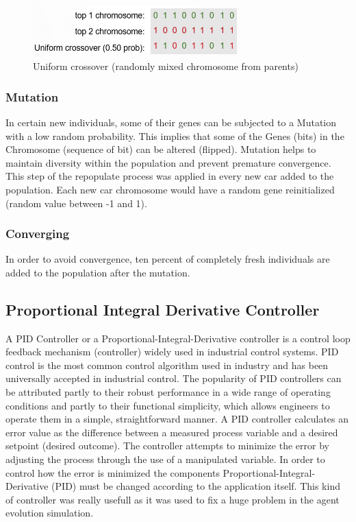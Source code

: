 \documentclass[conference]{IEEEtran}
\begin{document}
\begin{figure}[t]
    \centerline{\includegraphics[width=80mm,scale=4]{assets/uniform_crossover.png}}
    \caption{Uniform crossover (randomly mixed chromosome from parents)}
    \label{fig:crossover}
\end{figure}

\subsubsection{Mutation}
In certain new individuals, some of their genes can be subjected to a Mutation with a low random probability.
This implies that some of the Genes (bits) in the Chromosome (sequence of bit) can be altered (flipped). Mutation
helps to maintain diversity within the population and prevent premature convergence. This step of the repopulate process
was applied in every new car added to the population. Each new car chromosome would have a random gene reinitialized
(random value between -1 and 1).

\subsubsection{Converging}
In order to avoid convergence, ten percent of completely fresh individuals are added to the population after the mutation.

\subsection{Proportional Integral Derivative Controller}
A PID Controller or a Proportional-Integral-Derivative controller is a control loop feedback mechanism (controller)
widely used in industrial control systems. PID control is the most common control algorithm used in industry and
has been universally accepted in industrial control. The popularity of PID controllers can be attributed partly to
their robust performance in a wide range of operating conditions and partly to their functional simplicity, which
allows engineers to operate them in a simple, straightforward manner. A PID controller calculates an error value
as the difference between a measured process variable and a desired setpoint (desired outcome). The controller attempts
to minimize the error by adjusting the process through the use of a manipulated variable. In order to control how the error
is minimized the components Proportional-Integral-Derivative (PID) must be changed according to the application itself.
This kind of controller was really usefull as it was used to fix a huge problem in the agent evolution simulation.
\end{document}
